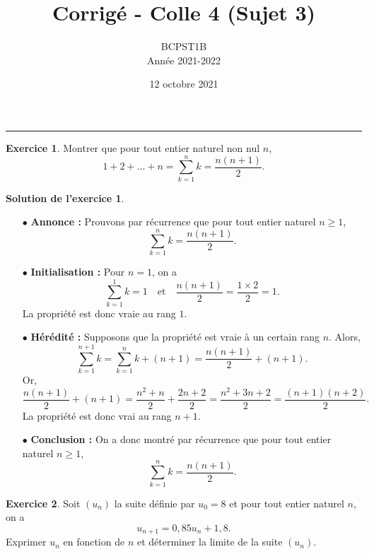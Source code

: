 \documentclass[a4paper, 11pt,openany]{article}%
\title{Corrigé - Colle 4 (Sujet 3)}
\author{BCPST1B\\
Année 2021-2022}
\date{12 octobre 2021}
\theoremstyle{plain}
\theoremstyle{definition}
\newtheorem{exo}{Exercice}
\newtheorem{sol}{Solution de l'exercice}
\theoremstyle{remark}
\begin{document}
   \maketitle
      \rule{\linewidth}{0.5mm}


\begin{exo}
Montrer que pour tout entier naturel non nul $n$,
\[ 1 + 2 + ... + n = \sum_{k=1}^n k = \frac{n(n+1)}{2}.\]
\end{exo}

\begin{sol}
 \begin{itemize}
\item[$\bullet$] \textbf{Annonce :} Prouvons par récurrence que pour tout entier naturel $n \geqslant 1$, 
\[ \sum_{k=1}^n k = \frac{n(n+1)}{2}.\]
\item[$\bullet$] \textbf{Initialisation :} Pour $n = 1$, on a
\[ \sum_{k=1}^1 k = 1 \quad \text{et} \quad \frac{n(n+1)}{2} = \frac{1 \times 2 }{2} = 1.\]
La propriété est donc vraie au rang $1$.
\item[$\bullet$] \textbf{Hérédité :} Supposons que la propriété est vraie à un certain rang $n$. Alors,
\[ \sum_{k=1}^{n+1} k  = \sum_{k=1}^n k + (n+1) = \frac{n(n+1)}{2} + (n+1).\]
Or,
\[  \frac{n(n+1)}{2} + (n+1) = \frac{n^2 + n}{2} + \frac{2n + 2 }{2 } =  \frac{n^2 + 3n + 2}{2} = \frac{(n+1)(n+2)}{2} .\]
La propriété est donc vrai au rang $n+1$.
\item[$\bullet$] \textbf{Conclusion :} On a donc montré par récurrence que pour tout entier naturel $n \geqslant 1$, 
\[ \sum_{k=1}^n k = \frac{n(n+1)}{2}.\]
\end{itemize}
\end{sol}


\begin{exo}
Soit $\left(u_{n} \right)$ la suite définie par $u_{0} =8$ et pour tout entier naturel $n$, on a
\[ u_{n+1} =0,85u_{n} +1,8.\]
Exprimer $u_n$ en fonction de $n$ et déterminer la limite de la suite $(u_n)$.
\end{exo}
\end{document}
